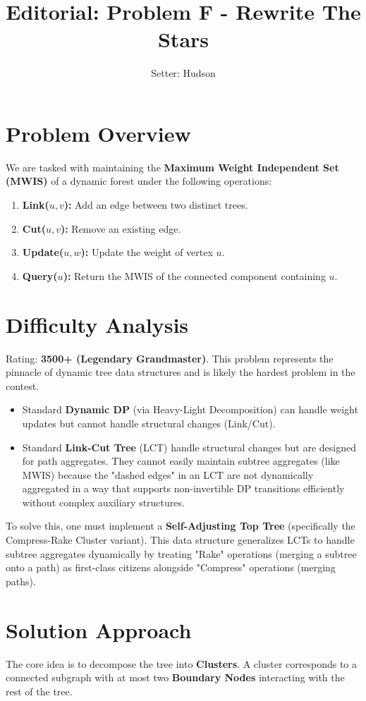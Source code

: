 \documentclass[11pt]{article}
\title{\textbf{Editorial: Problem F - Rewrite The Stars}}
\author{Setter: Hudson}
\date{}
\begin{document}
\maketitle

\section*{Problem Overview}
We are tasked with maintaining the \textbf{Maximum Weight Independent Set (MWIS)} of a dynamic forest under the following operations:
\begin{enumerate}
    \item \textbf{Link($u, v$):} Add an edge between two distinct trees.
    \item \textbf{Cut($u, v$):} Remove an existing edge.
    \item \textbf{Update($u, w$):} Update the weight of vertex $u$.
    \item \textbf{Query($u$):} Return the MWIS of the connected component containing $u$.
\end{enumerate}

\section*{Difficulty Analysis}
Rating: \textbf{3500+ (Legendary Grandmaster)}.
This problem represents the pinnacle of dynamic tree data structures and is likely the hardest problem in the contest.
\begin{itemize}
	\item Standard \textbf{Dynamic DP} (via Heavy-Light Decomposition) can handle weight updates but cannot handle structural changes (Link/Cut).
	\item Standard \textbf{Link-Cut Tree} (LCT) handle structural changes but are designed for path aggregates. They cannot easily maintain subtree aggregates (like MWIS) because the "dashed edges" in an LCT are not dynamically aggregated in a way that supports non-invertible DP transitions efficiently without complex auxiliary structures.
\end{itemize}
To solve this, one must implement a \textbf{Self-Adjusting Top Tree} (specifically the Compress-Rake Cluster variant). This data structure generalizes LCTs to handle subtree aggregates dynamically by treating "Rake" operations (merging a subtree onto a path) as first-class citizens alongside "Compress" operations (merging paths).

\section*{Solution Approach}
The core idea is to decompose the tree into \textbf{Clusters}. A cluster corresponds to a connected subgraph with at most two \textbf{Boundary Nodes} interacting with the rest of the tree.
\end{document}
